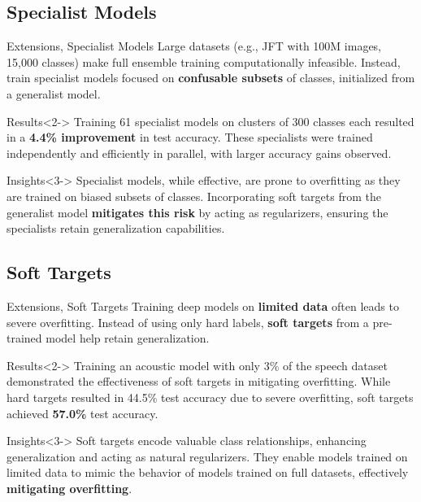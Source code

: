 \documentclass[aspectratio=1610]{beamer}
\begin{document}
    \subsection*{Specialist Models}
    \begin{frame}{Extensions, Specialist Models}
        Large datasets (e.g., JFT with 100M images, 15,000 classes) make full ensemble training computationally infeasible. Instead, train specialist models focused on \textbf{confusable subsets} of classes, initialized from a generalist model.

        \begin{block}{Results}<2->
            Training 61 specialist models on clusters of 300 classes each resulted in a \textbf{4.4\% improvement} in test accuracy. These specialists were trained independently and efficiently in parallel, with larger accuracy gains observed.
        \end{block}

        \begin{alertblock}{Insights}<3->
            Specialist models, while effective, are prone to overfitting as they are trained on biased subsets of classes. Incorporating soft targets from the generalist model \textbf{mitigates this risk} by acting as regularizers, ensuring the specialists retain generalization capabilities.
        \end{alertblock}
    \end{frame}

    \subsection*{Soft Targets}
    \begin{frame}{Extensions, Soft Targets}
        Training deep models on \textbf{limited data} often leads to severe overfitting. Instead of using only hard labels, \textbf{soft targets} from a pre-trained model help retain generalization.

        \begin{block}{Results}<2->
            Training an acoustic model with only 3\% of the speech dataset demonstrated the effectiveness of soft targets in mitigating overfitting. While hard targets resulted in 44.5\% test accuracy due to severe overfitting, soft targets achieved \textbf{57.0\%} test accuracy.
        \end{block}

        \begin{alertblock}{Insights}<3->
            Soft targets encode valuable class relationships, enhancing generalization and acting as natural regularizers. They enable models trained on limited data to mimic the behavior of models trained on full datasets, effectively \textbf{mitigating overfitting}.
        \end{alertblock}
    \end{frame}
\end{document}
